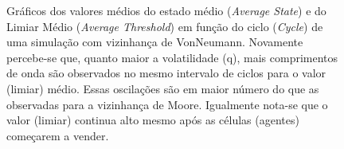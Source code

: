 \documentclass[
	12pt,				%
	openright,			%
	twoside,			%
	a4paper,			%
	english,			%
	french,				%
	spanish,			%
	brazil				%
	]{abntex2}
\begin{document}
\begin{figure}
  \centering

  
  \caption{Gráficos dos valores médios do estado médio (\textit{Average State}) e do Limiar Médio (\textit{Average Threshold}) em função do ciclo (\textit{Cycle}) de uma simulação com vizinhança de VonNeumann. Novamente percebe-se que, quanto maior a volatilidade (q), mais comprimentos de onda são observados no mesmo intervalo de ciclos para o valor (limiar) médio. Essas oscilações são em maior número do que as observadas para a vizinhança de Moore. Igualmente nota-se que o valor (limiar) continua alto mesmo após as células (agentes) começarem a vender. }
  \label{fig:volatilidadeVonNeumann}
\end{figure}
\end{document}
